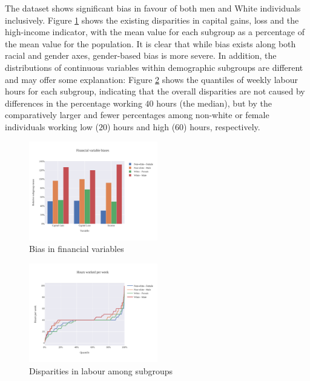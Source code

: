 \documentclass[conference]{IEEEtran}
\begin{document}
The dataset shows significant bias in favour of both men and White individuals inclusively. Figure \ref{fig:fin_bias} shows the existing disparities in capital gains, loss and the high-income indicator, with the mean value for each subgroup as a percentage of the mean value for the population. It is clear that while bias exists along both racial and gender axes, gender-based bias is more severe. In addition, the distributions of continuous variables within demographic subgroups are different and may offer some explanation: Figure \ref{fig:hour_bias} shows the quantiles of weekly labour hours for each subgroup, indicating that the overall disparities are not caused by differences in the percentage working $40$ hours (the median), but by the comparatively larger and fewer percentages among non-white or female individuals working low ($20$) hours and high ($60$) hours, respectively.

\begin{figure}[h]
    \centering
    \includegraphics[width=0.5\textwidth]{images/fin_bias.pdf}
    \caption{Bias in financial variables}
    \label{fig:fin_bias}
\end{figure}

\begin{figure}[h]
    \centering
    \includegraphics[width=0.5\textwidth]{images/hours_bias.pdf}
    \caption{Disparities in labour among subgroups}
    \label{fig:hour_bias}
\end{figure}
\end{document}
